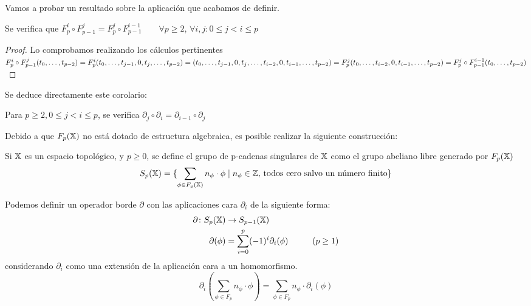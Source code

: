 Vamos a probar un resultado sobre la aplicación que acabamos de definir.

\begin{lemma}
  Se verifica que $F_p^i \circ F_{p-1}^j = F_p^j \circ F_{p-1}^{i-1} \quad \quad \forall p \geq 2$, $\forall i, j \colon 0 \leq j < i \leq p$
\end{lemma}

\begin{proof}
Lo comprobamos realizando los cálculos pertinentes \\
    $ F_p^i \circ F_{p-1}^j (t_0, \dots, t_{p-2}) = F_p^i (t_0, \dots, t_{j-1}, 0, t_j, \dots, t_{p-2}) = \\
    (t_0, \dots, t_{j-1}, 0, t_j, \dots, t_{i-2}, 0, t_{i-1}, \dots, t_{p-2}) = \\
    F_p^j (t_0, \dots, t_{i-2}, 0, t_{i-1}, \dots, t_{p-2}) = F_p^j \circ F_{p-1}^{i-1} (t_0, \dots, t_{p-2}) $
\end{proof}

Se deduce directamente este corolario:

\begin{corollary}
  Para $p \geq 2, 0 \leq j < i \leq p$, se verifica $\partial_j \circ \partial_i = \partial_{i-1} \circ \partial_j$
\end{corollary}

Debido a que $F_{p}({\mathbb X})$ no está dotado de estructura algebraica, es posible realizar la siguiente construcción:

\begin{definition}
  Si ${\mathbb X}$ es un espacio topológico, y $p \geq 0$, se define el grupo de p-cadenas singulares de ${\mathbb X}$
  como el grupo abeliano libre generado por $F_{p}({\mathbb X})$
  \[ S_p({\mathbb X}) = \{\sum_{\phi \in F_{p}({\mathbb X})} n_\phi \cdot \phi  \mid n_\phi \in \mathbb{Z} \text{, todos cero salvo un número finito} \}\]

  Podemos definir un operador borde $\partial$ con las aplicaciones cara $\partial_i$ de la siguiente forma:
  \begin{align*}
    \partial \colon S_p({\mathbb X}) &\to S_{p-1}({\mathbb X})\\
    \partial(\phi) &= \sum_{i = 0}^p (-1)^i \partial_i(\phi)  \hspace{1cm} (p \geq 1)
  \end{align*}
  considerando $\partial_i$ como una extensión de la aplicación cara a un homomorfismo.
  \[\partial_i(\sum_{\phi \in F_p} n_\phi \cdot \phi) = \sum_{\phi \in F_p} n_\phi \cdot \partial_i(\phi) \]
\end{definition}


